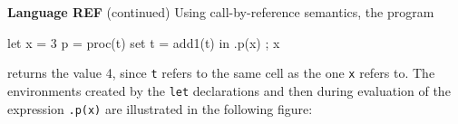 \begin{minipage}[t]{\sw}
\slidenumber
\LARGE
{\bf Language REF} (continued)\exx
Using call-by-reference semantics,
the program
\begin{qv}
let
  x = 3
  p = proc(t) set t = add1(t)
in
  { .p(x) ; x }
\end{qv}
returns the value 4, since \verb't' refers
to the same cell as the one \verb'x' refers to.
The environments created by the \verb'let' declarations
and then during evaluation of the expression \verb'.p(x)'
are illustrated in the following figure:
\end{minipage}
